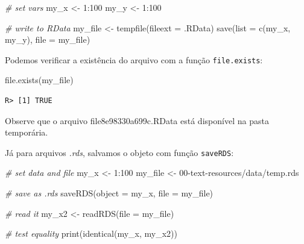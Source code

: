 \documentclass[
  11pt,
]{book}
\newenvironment{Shaded}{\begin{snugshade}}{\end{snugshade}}
\newcommand{\AttributeTok}[1]{\textcolor[rgb]{0.61,0.61,0.61}{#1}}
\newcommand{\CommentTok}[1]{\textcolor[rgb]{0.37,0.37,0.37}{\textit{#1}}}
\newcommand{\DecValTok}[1]{\textcolor[rgb]{0.06,0.06,0.06}{#1}}
\newcommand{\FunctionTok}[1]{\textcolor[rgb]{0,0,0}{#1}}
\newcommand{\NormalTok}[1]{#1}
\newcommand{\OtherTok}[1]{\textcolor[rgb]{0.37,0.37,0.37}{#1}}
\newcommand{\SpecialCharTok}[1]{\textcolor[rgb]{0,0,0}{#1}}
\newcommand{\StringTok}[1]{\textcolor[rgb]{0.5,0.5,0.5}{#1}}
\begin{document}
\begin{Shaded}
\begin{Highlighting}[]
\CommentTok{\# set vars}
\NormalTok{my\_x }\OtherTok{\textless{}{-}} \DecValTok{1}\SpecialCharTok{:}\DecValTok{100}
\NormalTok{my\_y }\OtherTok{\textless{}{-}} \DecValTok{1}\SpecialCharTok{:}\DecValTok{100}

\CommentTok{\# write to RData}
\NormalTok{my\_file }\OtherTok{\textless{}{-}} \FunctionTok{tempfile}\NormalTok{(}\AttributeTok{fileext =} \StringTok{\textquotesingle{}.RData\textquotesingle{}}\NormalTok{)}
\FunctionTok{save}\NormalTok{(}\AttributeTok{list =} \FunctionTok{c}\NormalTok{(}\StringTok{\textquotesingle{}my\_x\textquotesingle{}}\NormalTok{, }\StringTok{\textquotesingle{}my\_y\textquotesingle{}}\NormalTok{),}
     \AttributeTok{file =}\NormalTok{ my\_file)}
\end{Highlighting}
\end{Shaded}

Podemos verificar a existência do arquivo com a função \texttt{file.exists}:

\begin{Shaded}
\begin{Highlighting}[]
\FunctionTok{file.exists}\NormalTok{(my\_file)}
\end{Highlighting}
\end{Shaded}

\begin{verbatim}
R> [1] TRUE
\end{verbatim}

Observe que o arquivo file8e98330a699c.RData está disponível na pasta temporária.

Já para arquivos \emph{.rds}, salvamos o objeto com função \texttt{saveRDS}:

\begin{Shaded}
\begin{Highlighting}[]
\CommentTok{\# set data and file}
\NormalTok{my\_x }\OtherTok{\textless{}{-}} \DecValTok{1}\SpecialCharTok{:}\DecValTok{100}
\NormalTok{my\_file }\OtherTok{\textless{}{-}} \StringTok{\textquotesingle{}00{-}text{-}resources/data/temp.rds\textquotesingle{}}

\CommentTok{\# save as .rds}
\FunctionTok{saveRDS}\NormalTok{(}\AttributeTok{object =}\NormalTok{ my\_x,}
        \AttributeTok{file =}\NormalTok{ my\_file)}

\CommentTok{\# read it}
\NormalTok{my\_x2 }\OtherTok{\textless{}{-}} \FunctionTok{readRDS}\NormalTok{(}\AttributeTok{file =}\NormalTok{ my\_file)}

\CommentTok{\# test equality}
\FunctionTok{print}\NormalTok{(}\FunctionTok{identical}\NormalTok{(my\_x, my\_x2))}
\end{Highlighting}
\end{Shaded}
\end{document}
